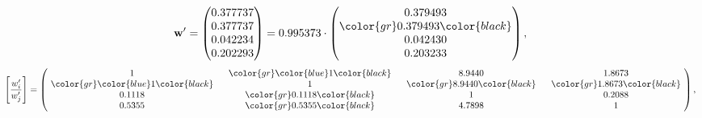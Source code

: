 \begin{example}
\begin{equation*}
\mathbf{w}^{\prime} =
\begin{pmatrix}
0.377737\\
0.377737\\
0.042234\\
0.202293
\end{pmatrix} =
0.995373\cdot
\begin{pmatrix}
0.379493\\
\color{gr} 0.379493\color{black} \\
0.042430\\
0.203233
\end{pmatrix},
\end{equation*}
\begin{equation*}
\left[ \frac{{w}^{\prime}_i}{{w}^{\prime}_j} \right] =
\begin{pmatrix}
$\,\,$ 1 $\,\,$ & $\,\,$\color{gr} \color{blue} 1\color{black} $\,\,$ & $\,\,$8.9440$\,\,$ & $\,\,$1.8673$\,\,$ \\
$\,\,$\color{gr} \color{blue} 1\color{black} $\,\,$ & $\,\,$ 1 $\,\,$ & $\,\,$\color{gr} 8.9440\color{black} $\,\,$ & $\,\,$\color{gr} 1.8673\color{black}   $\,\,$ \\
$\,\,$0.1118$\,\,$ & $\,\,$\color{gr} 0.1118\color{black} $\,\,$ & $\,\,$ 1 $\,\,$ & $\,\,$0.2088 $\,\,$ \\
$\,\,$0.5355$\,\,$ & $\,\,$\color{gr} 0.5355\color{black} $\,\,$ & $\,\,$4.7898$\,\,$ & $\,\,$ 1  $\,\,$ \\
\end{pmatrix},
\end{equation*}
\end{example}
\newpage
